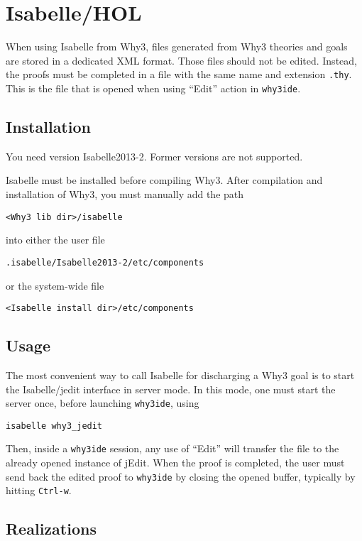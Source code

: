 \section{Isabelle/HOL}
\label{sec:isabelle}


When using Isabelle from Why3, files generated from Why3 theories and
goals are stored in a dedicated XML format. Those files should not be
edited. Instead, the proofs must be completed in a file with the same
name and extension \texttt{.thy}. This is the file that is opened when
using ``Edit'' action in \texttt{why3ide}.

\subsection{Installation}

You need version Isabelle2013-2. Former versions are not supported.

Isabelle must be installed before compiling Why3. After compilation
and installation of Why3, you must manually add the path 
\begin{verbatim}
<Why3 lib dir>/isabelle
\end{verbatim}
into either the user file 
\begin{verbatim}
.isabelle/Isabelle2013-2/etc/components
\end{verbatim}
or the system-wide file 
\begin{verbatim}
<Isabelle install dir>/etc/components
\end{verbatim}

\subsection{Usage}

The most convenient way to call Isabelle for discharging a Why3 goal
is to start the Isabelle/jedit interface in server mode. In this mode,
one must start the server once, before launching \texttt{why3ide},
using
\begin{verbatim}
isabelle why3_jedit
\end{verbatim}
Then, inside a \texttt{why3ide} session, any use of ``Edit'' will
transfer the file to the already opened instance of jEdit. When the
proof is completed, the user must send back the edited proof to
\texttt{why3ide} by closing the opened buffer, typically by hitting
\texttt{Ctrl-w}.

\subsection{Realizations}


